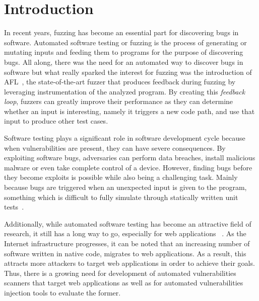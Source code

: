 \section{Introduction}

In recent years, fuzzing has become an essential part for discovering bugs in software. Automated software testing
or fuzzing is the process of generating or mutating inputs and feeding them to programs for the purpose of discovering
bugs. All along, there was the need for an automated way to discover bugs in software but what really sparked the
interest for fuzzing was the introduction of AFL~\cite{zalewski2015american}, the state-of-the-art fuzzer that produces feedback 
during fuzzing by leveraging instrumentation of the analyzed program. By creating this \emph{feedback loop}, fuzzers can greatly improve their performance as they  
can determine whether an input is interesting, namely it triggers a new code path, and use that input to produce other test 
cases.  

Software testing plays a significant role in software development cycle because when vulnerabilities
are present, they can have severe consequences. By exploiting software bugs, adversaries can perform
data breaches, install malicious malware or even take complete control of a device. However, finding bugs before they 
become exploits is possible while also being a challenging task. Mainly because bugs are triggered when an unexpected input 
is given to the program, something which is difficult to fully simulate through statically written unit tests~\cite{aschermann2019nautilus}.

Additionally, while automated software testing has become an attractive field of research, it still has a long way to go, 
especially for web applications ~\cite{doupe2010johnny}. As the Internet infrastructure progresses, it can be noted that an 
increasing number of software written in native code, migrates to web applications. As a result, this attracts more attackers to 
target web applications in order to achieve their goals. Thus, there is a growing need for development of automated 
vulnerabilities scanners that target web applications as well as for automated vulnerabilities injection tools to evaluate the former.

